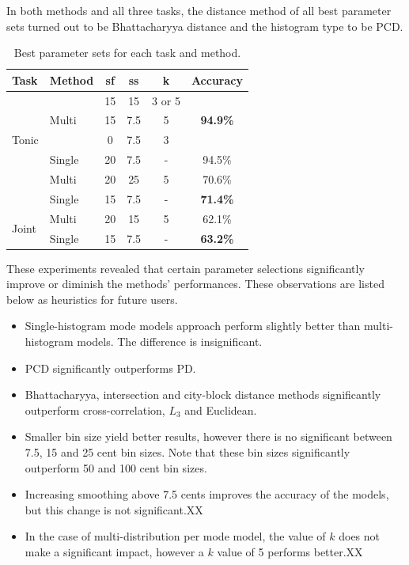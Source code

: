 \documentclass{sig-alternate}
\begin{document}
In both methods and all three tasks, the distance method of all best parameter sets turned out to be Bhattacharyya distance and the histogram type to be PCD.

\begin{table}
\label{tab:best_results}
\caption{Best parameter sets for each task and method.}
 \begin{center}
\begin{tabular}{ l l c c c c }
\hline
\textbf{Task} & \textbf{Method} & \textbf{sf} & \textbf{ss} & \textbf{k} & \textbf{Accuracy}\\ \hline
\multirow{5}{*}{Tonic} & \multirow{3}{*}{Multi} & 15 & 15 & 3 or 5 &\multirow{3}{*}{\textbf{94.9\%}}\\
 & & 15 & 7.5 & 5 &\\
  & & 0 & 7.5 & 3 &\\
 \cline{2-6}
 & Single & 20 & 7.5 & - & 94.5\% \\ \hline
\multirow{2}{*}{Mode} & Multi & 20 & 25 & 5 & 70.6\% \\
\cline{2-6}
& Single & 15 & 7.5 & - & \textbf{71.4\%}\\ \hline
\multirow{2}{*}{Joint} & Multi & 20 & 15 & 5 & 62.1\%\\
\cline{2-6}
& Single & 15 & 7.5 & - & \textbf{63.2\%}\\ \hline
\end{tabular}
\end{center}
\end{table}
These experiments revealed that certain parameter selections significantly improve or diminish the methods' performances. These observations are listed below as heuristics for future users.
\begin{itemize}[noitemsep]
\item Single-histogram mode models approach perform slightly better than multi-histogram models. The difference is insignificant.
\item PCD significantly outperforms PD.
\item Bhattacharyya, intersection and city-block distance methods significantly outperform cross-correlation, $L_3$ and Euclidean.
\item Smaller bin size yield better results, however there is no significant between 7.5, 15 and 25 cent bin sizes. Note that these bin sizes significantly outperform 50 and 100 cent bin sizes.
\item Increasing smoothing above 7.5 cents improves the accuracy of the models, but this change is not significant.XX
\item In the case of multi-distribution per mode model, the value of $k$ does not make a significant impact, however a $k$ value of 5 performs better.XX
\end{itemize}
\end{document}
